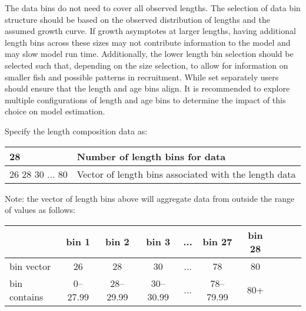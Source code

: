 The data bins do not need to cover all observed lengths. The selection of data bin structure should be based on the observed distribution of lengths and the assumed growth curve. If growth asymptotes at larger lengths, having additional length bins across these sizes may not contribute information to the model and may slow model run time. Additionally, the lower length bin selection should be selected such that, depending on the size selection, to allow for information on smaller fish and possible patterns in recruitment. While set separately users should ensure that the length and age bins align. It is recommended to explore multiple configurations of length and age bins to determine the impact of this choice on model estimation.

Specify the length composition data as:
\begin{center}
	\begin{tabular}{p{4cm} p{10cm}}
		\hline
		28 & Number of length bins for data \\
		\hline
		26 28 30 ... 80 & Vector of length bins associated with the length data \\
		\hline
	\end{tabular}
	\leavevmode\tagmcend\tagstructend\par
\end{center}
Note: the vector of length bins above will aggregate data from outside
the range of values as follows:
\begin{center}
    \begin{tabular}{lccccccccc}
		\hline
  		             & bin 1 & bin 2 & bin 3 & ... & bin 27 & bin 28 \\ 
		\hline
 		bin vector   & 26 & 28 & 30 & ... & 78 & 80 \\ 
    	bin contains & 0--27.99 & 28--29.99 & 30--30.99 & ... & 78--79.99 & 80+ \\
		\hline
    \end{tabular}
	\leavevmode\tagmcend\tagstructend\par
\end{center}

